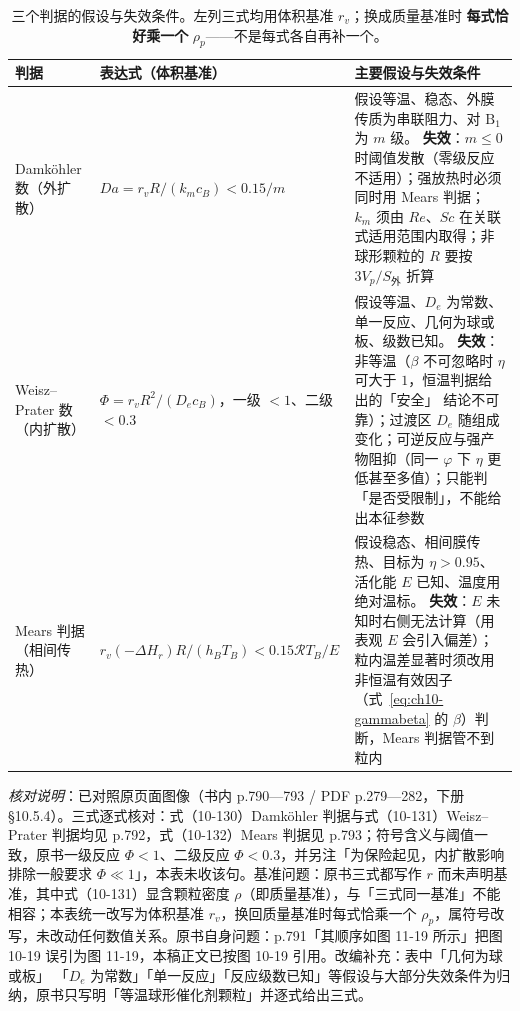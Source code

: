 \begin{table}[htbp]
\centering
\caption{三个判据的假设与失效条件。左列三式均用体积基准 $r_v$；换成质量基准时
\textbf{每式恰好乘一个} $\rho_p$——不是每式各自再补一个。
}
\label{tab:ch10-criteria}
\begin{tabularx}{\textwidth}{@{}l X X@{}}
\toprule
判据 & 表达式（体积基准） & 主要假设与失效条件 \\
\midrule
Damk\"ohler 数（外扩散） & $Da=r_vR/(k_mc_B)<0.15/m$ &
假设等温、稳态、外膜传质为串联阻力、对 $\mathrm{B_1}$ 为 $m$ 级。
\textbf{失效}：$m\le0$ 时阈值发散（零级反应不适用）；强放热时必须同时用 Mears 判据；
$k_m$ 须由 $Re$、$Sc$ 在关联式适用范围内取得；非球形颗粒的 $R$ 要按 $3V_p/S_{\text{外}}$
折算 \\
Weisz--Prater 数（内扩散） & $\Phi=r_vR^{2}/(D_ec_B)$，一级 $<1$、二级 $<0.3$ &
假设等温、$D_e$ 为常数、单一反应、几何为球或板、级数已知。
\textbf{失效}：非等温（$\beta$ 不可忽略时 $\eta$ 可大于 $1$，恒温判据给出的「安全」
结论不可靠）；过渡区 $D_e$ 随组成变化；可逆反应与强产物阻抑（同一 $\varphi$ 下 $\eta$
更低甚至多值）；只能判「是否受限制」，不能给出本征参数 \\
Mears 判据（相间传热） & $r_v(-\Delta H_r)R/(h_BT_B)<0.15\mathscr{R}T_B/E$ &
假设稳态、相间膜传热、目标为 $\eta>0.95$、活化能 $E$ 已知、温度用绝对温标。
\textbf{失效}：$E$ 未知时右侧无法计算（用表观 $E$ 会引入偏差）；粒内温差显著时须改用
非恒温有效因子（式~\eqref{eq:ch10-gammabeta} 的 $\beta$）判断，Mears 判据管不到粒内 \\
\bottomrule
\end{tabularx}
\end{table}

\emph{核对说明}：已对照原页面图像（书内 p.790—793 / PDF p.279—282，下册 §10.5.4）。三式逐式核对：式（10-130）Damköhler 判据与式（10-131）Weisz--Prater 判据均见
p.792，式（10-132）Mears 判据见 p.793；符号含义与阈值一致，原书一级反应 $\Phi<1$、二级反应
$\Phi<0.3$，并另注「为保险起见，内扩散影响排除一般要求 $\Phi\ll1$」，本表未收该句。基准问题：原书三式都写作
$r$ 而未声明基准，其中式（10-131）显含颗粒密度 $\rho$（即质量基准），与「三式同一基准」不能相容；本表统一改写为体积基准
$r_v$，换回质量基准时每式恰乘一个 $\rho_p$，属符号改写，未改动任何数值关系。原书自身问题：p.791「其顺序如图
11-19 所示」把图 10-19 误引为图 11-19，本稿正文已按图 10-19 引用。改编补充：表中「几何为球或板」
「$D_e$ 为常数」「单一反应」「反应级数已知」等假设与大部分失效条件为归纳，原书只写明「等温球形催化剂颗粒」并逐式给出三式。


